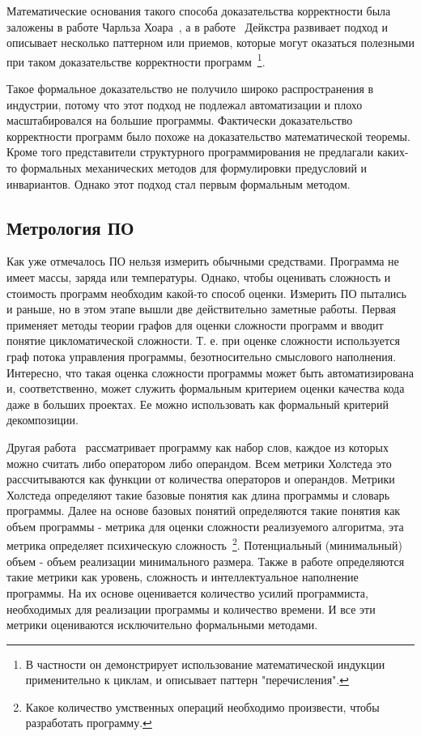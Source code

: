 Математические основания такого способа доказательства корректности была заложены в работе Чарльза Хоара~\cite{Hoare:1969:ABC}, а в работе~\cite{Dijkstra:1972:CIN} Дейкстра развивает подход и описывает несколько паттерном или приемов, которые могут оказаться полезными при таком доказательстве корректности программ~\footnote{В частности он демонстрирует использование математической индукции применительно к циклам, и описывает паттерн "перечисления".}.

Такое формальное доказательство не получило широко распространения в индустрии, потому что этот подход не подлежал автоматизации и плохо масштабировался на большие программы. Фактически доказательство корректности программ было похоже на доказательство математической теоремы. Кроме того представители структурного программирования не предлагали каких-то формальных механических методов для формулировки предусловий и инвариантов. Однако этот подход стал первым формальным методом.

\subsection{Метрология ПО}

Как уже отмечалось ПО нельзя измерить обычными средствами. Программа не имеет массы, заряда или температуры. Однако, чтобы оценивать сложность и стоимость программ необходим какой-то способ оценки. Измерить ПО пытались и раньше, но в этом этапе вышли две действительно заметные работы. Первая~\cite{McCabe:1976:CM} применяет методы теории графов для оценки сложности программ и вводит понятие цикломатической сложности. Т. е. при оценке сложности используется граф потока управления программы, безотносительно смыслового наполнения. Интересно, что такая оценка сложности программы может быть автоматизирована и, соответственно, может служить формальным критерием оценки качества кода даже в больших проектах. Ее можно использовать как формальный критерий декомпозиции.

Другая работа~\cite{Halstead:1977:ESS} рассматривает программу как набор слов, каждое из которых можно считать либо оператором либо операндом. Всем метрики Холстеда это рассчитываются как функции от количества операторов и операндов. Метрики Холстеда определяют такие базовые понятия как длина программы и словарь программы. Далее на основе базовых понятий определяются такие понятия как объем программы - метрика для оценки сложности реализуемого алгоритма, эта метрика определяет психическую сложность~\footnote{Какое количество умственных операций необходимо произвести, чтобы разработать программу.}. Потенциальный (минимальный) объем - объем реализации минимального размера. Также в работе определяются такие метрики как уровень, сложность и интеллектуальное наполнение программы. На их основе оценивается количество усилий программиста, необходимых для реализации программы и количество времени. И все эти метрики оцениваются исключительно формальными методами.

